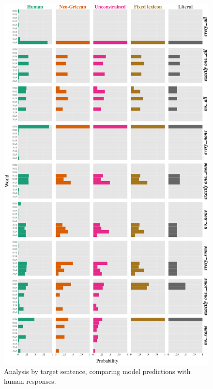 \documentclass[leqno,12pt]{article}
\begin{document}
\begin{figure}[!t]
  \centering
  \includegraphics[height=0.92\textheight]{fig/allmodels-binary}
  \caption{Analysis by target sentence, comparing model predictions
    with human responses.}
  \label{fig:exp-analysis}
\end{figure}

\end{document}

